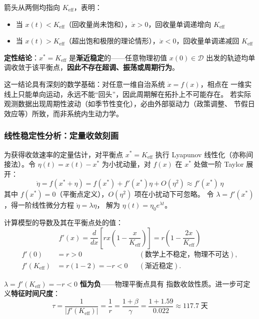 \documentclass[12pt,a4paper]{ctexart}
\begin{document}
箭头从两侧均指向 $K_{\text{eff}}$，表明：
\begin{itemize}
  \item 当 $x(t) < K_{\text{eff}}$（回收量尚未饱和），$\dot{x} > 0$，回收量单调递增向 $K_{\text{eff}}$
  \item 当 $x(t) > K_{\text{eff}}$（超出饱和极限的理论情形），$\dot{x} < 0$，回收量单调递减回 $K_{\text{eff}}$
\end{itemize}

\textbf{定性结论}：$x^* = K_{\text{eff}}$ 是\textbf{渐近稳定}的——任意物理初值 $x(0) \in \mathcal{D}$
出发的轨迹均单调收敛于该平衡点，\textbf{因此不存在超调、振荡或周期行为}。

这一结论具有深刻的数学基础：对任意一维自治系统 $\dot{x} = f(x)$，相点在
一维实线上只能单向运动，永远不能``回头''，因此周期解在拓扑上不可能存在。
若实际观测数据出现周期性波动（如季节性变化），必由外部驱动力（政策调整、
节假日效应等）所致，而非系统内生动力学。

\subsubsection{线性稳定性分析：定量收敛刻画}

为获得收敛速率的定量估计，对平衡点 $x^* = K_{\text{eff}}$ 执行 Lyapunov
线性化（亦称间接法）。令 $\eta(t) = x(t) - x^*$ 为小扰动量，对 $f(x)$
在 $x^*$ 处做一阶 Taylor 展开：
\begin{equation}
\dot{\eta} = f(x^* + \eta) = f(x^*) + f'(x^*)\eta + O(\eta^2)
           \approx f'(x^*)\,\eta
\end{equation}
其中 $f(x^*) = 0$（平衡点定义），$O(\eta^2)$ 项在小扰动下可忽略。
令 $\lambda = f'(x^*)$，得一阶线性微分方程 $\dot{\eta} = \lambda \eta$，
解为 $\eta(t) = \eta_0 e^{\lambda t}$。

计算模型的导数及其在平衡点处的值：
\begin{equation}
f'(x) = \frac{d}{dx}\left[ r x \left(1 - \frac{x}{K_{\text{eff}}}\right) \right]
       = r\left(1 - \frac{2x}{K_{\text{eff}}}\right)
\end{equation}
\begin{equation}
\begin{aligned}
f'(0) &= r > 0 &&(\text{数学上不稳定，物理不可达}),\\
f'(K_{\text{eff}}) &= r(1 - 2) = -r < 0 &&(\text{渐近稳定}).
\end{aligned}
\end{equation}

$\lambda = f'(K_{\text{eff}}) = -r < 0$ \textbf{恒为负}——物理平衡点具有
指数收敛性质。进一步可定义\textbf{特征时间尺度}：
\begin{equation}
\tau = \frac{1}{|f'(K_{\text{eff}})|} = \frac{1}{r}
     = \frac{1+\beta}{\gamma}
     = \frac{1+1.59}{0.022} \approx 117.7 \;\text{天}
\end{equation}
\end{document}
